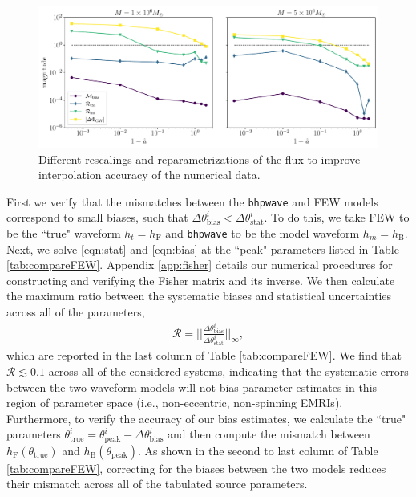 \documentclass[%
 reprint,
 nofootinbib,
 amsmath,amssymb,
 aps,
 prd,
]{revtex4-2}
\begin{document}
\begin{figure}[!htp]
    \centering
    \includegraphics[width=0.98\linewidth]{figures/flux_error.pdf}
    \caption{Different rescalings and reparametrizations of the flux to improve interpolation accuracy of the numerical data.}
    \label{fig:errorBiases}
\end{figure}

First we verify that the mismatches between the \texttt{bhpwave} and FEW models correspond to small biases, such that $\Delta {\theta}^{i}_\mathrm{bias} < \Delta {\theta}^{i}_\mathrm{stat}$. To do this, we take FEW to be the ``true" waveform $h_t = h_\mathrm{F}$ and \texttt{bhpwave} to be the model waveform $h_m = h_\mathrm{B}$. Next, we solve \eqref{eqn:stat} and \eqref{eqn:bias} at the ``peak" parameters listed in Table \ref{tab:compareFEW}. Appendix \ref{app:fisher} details our numerical procedures for constructing and verifying the Fisher matrix and its inverse. We then calculate the maximum ratio between the systematic biases and statistical uncertainties across all of the parameters,
\begin{align}
    \mathcal{R} = \bigg|\bigg|\frac{\Delta \theta^i_\mathrm{bias}}{\Delta {\theta}^i_\mathrm{stat}}\bigg|\bigg|_\infty,
\end{align}
which are reported in the last column of Table \ref{tab:compareFEW}. We find that $\mathcal{R} \lesssim 0.1$ across all of the considered systems, indicating that the systematic errors between the two waveform models will not bias parameter estimates in this region of parameter space (i.e., non-eccentric, non-spinning EMRIs). Furthermore, to verify the accuracy of our bias estimates, we calculate the ``true" parameters $\theta^i_\mathrm{true} = \theta^i_\mathrm{peak} - \Delta \theta^i_\mathrm{bias}$ and then compute the mismatch between $h_\mathrm{F}(\theta_\mathrm{true})$ and $h_\mathrm{B}(\theta_\mathrm{peak})$. As shown in the second to last column of Table \ref{tab:compareFEW}, correcting for the biases between the two models reduces their mismatch across all of the tabulated source parameters.
\end{document}
